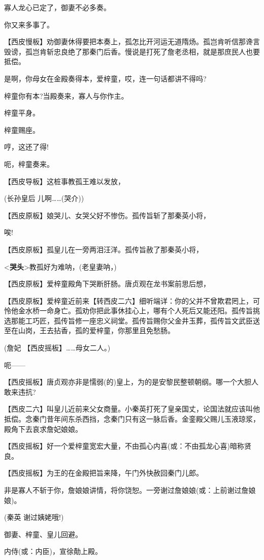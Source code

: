 寡人龙心已定了，御妻不必多奏。

你又来多事了。

【西皮慢板】劝御妻休得要把本奏上，孤怎比开河运无道隋炀。孤岂肯听信那谗言毁谤，孤岂肯斩忠良绝了那秦门后香。慢说是打死了詹老丞相，就是那庶民人也要抵偿。

是啊，你母女在金殿奏得本，爱梓童，哎，连一句话都讲不得吗?

梓童你有本?当殿奏来，寡人与你作主。

梓童平身。

梓童赐座。

哼，这还了得!

呃，梓童奏来。

【西皮导板】这桩事教孤王难以发放，

(长孙皇后 儿啊\ldots{}\ldots{}(哭介))

【西皮原板】娘哭儿、女哭父好不惨伤。孤传旨斩了那秦英小将，

唉!

【西皮原板】孤皇儿在一旁两泪汪洋。孤传旨赦了那秦英小将，

\textless{}\textbf{哭头}\textgreater{}教孤好为难呐，(老皇妻呐，)

【西皮原板】爱梓童殿角下哭断肝肠。唐贞观在龙书案前思后想，

【西皮原板】爱梓童近前来【转西皮二六】细听端详：你的父并不曾欺君罔上，可怜他金水桥一命身亡。孤劝你把此事休挂心上，哪有个人死后又能还阳。孤传旨挑选那能工巧匠，孤传旨修一座忠义祠堂。孤传旨赐你父金井玉葬，孤传旨文武臣送至在山岗，王去拈香，孤的爱梓童，你那里且免愁肠。

(詹妃 【西皮摇板】\ldots{}\ldots{}母女二人。)

呃------

【西皮摇板】唐贞观亦非是懦弱(的)皇上，为的是安黎民整顿朝纲。哪一个大胆人敢来违抗?

【西皮二六】叫皇儿近前来父女商量。小秦英打死了皇亲国丈，论国法就应该叫他抵偿。念秦门昔年间东杀西挡，念秦门只有这一脉后香。金銮殿父赐儿玉液琼浆，殿角下去哀求詹妃娘娘。

【西皮摇板】好一个爱梓童宽宏大量，不由孤心内喜(或：不由孤龙心喜)暗称贤良。

【西皮摇板】为王的在金殿把旨来降，午门外快赦回秦门儿郎。

非是寡人不斩于你，詹娘娘讲情，将你饶恕。一旁谢过詹娘娘(或：上前谢过詹娘娘)。

(秦英 谢过姨姥哦!)

御妻、梓童、皇儿回避。

内侍(或：内臣)，宣徐勣上殿。

